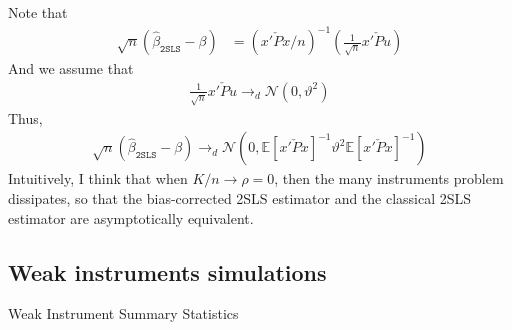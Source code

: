 \documentclass[12pt]{article}
\newcommand{\E}{\mathbb{E}}
\newcommand{\mtx}[1]{\ensuremath{\bm{\mathit{#1}}}}
\newcommand{\N}{\mathcal{N}}
\begin{document}
\subsubsection{}
Note that
\begin{align*}
\sqrt{n}(\hat\beta_{\texttt{2SLS}} - \beta) &= (\mtx{x}'\check{\mtx{P}}\mtx{x}/n)^{-1}(\frac{1}{\sqrt{n}}\mtx{x}'\check{\mtx{P}}\mtx{u})
\end{align*}
And we assume that
\begin{align*}
\frac{1}{\sqrt{n}}\mtx{x}'\check{\mtx{P}}\mtx{u} \to_d \N(0, \vartheta^2)
\end{align*}
Thus,
\begin{align*}
\sqrt{n}(\hat\beta_{\texttt{2SLS}} - \beta) \to_d \N(0, \E[\mtx{x}'\check{\mtx{P}}\mtx{x}]^{-1}\vartheta^2\E[\mtx{x}'\check{\mtx{P}}\mtx{x}]^{-1})
\end{align*}
Intuitively, I think that when $K/n \to \rho = 0$, then the many instruments problem dissipates, so that the bias-corrected 2SLS estimator and the classical 2SLS estimator are asymptotically equivalent.

\newpage
\begin{landscape}
\section{Weak instruments simulations}
\begin{table}[!htp]
\centering
\renewcommand{\arraystretch}{1.5}  
\caption{Weak Instrument Summary Statistics}\label{tab:weak_IV_simulation}
\resizebox{0.45\paperwidth}{0.021\paperwidth}{\subfloat[][$\gamma^2=0/n$ ($F\approx1$)]{}}
\resizebox{0.45\paperwidth}{0.021\paperwidth}{\subfloat[][$\gamma^2=0.25/n$ ($F\approx1.25$)]{}}\\
\resizebox{0.45\paperwidth}{0.021\paperwidth}{\subfloat[][$\gamma^2=9/n$ ($F\approx10$)]{}}
\resizebox{0.45\paperwidth}{0.021\paperwidth}{\subfloat[][$\gamma^2=99/n$ ($F\approx100$)]{}}\\
\end{table}
\end{landscape}
\end{document}
